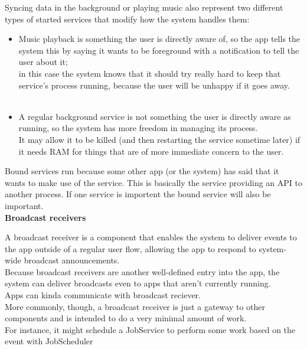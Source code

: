 \newpage

Syncing data in the background or playing music also represent two different types of started services that modify how the system handles them:\\ 
\begin{itemize}
    \item Music playback is something the user is directly aware of, so the app tells the system this by saying it wants to be foreground with a notification to tell the user about it; \\
    in this case the system knows that it should try really hard to keep that service's process running, because the user will be unhappy if it goes away.\\\\
    \item A regular background service is not something the user is directly aware as running, so the system has more freedom in managing its process. \\
    It may allow it to be killed (and then restarting the service sometime later) if it needs RAM for things that are of more immediate concern to the user.\\
\end{itemize}

Bound services run because some other app (or the system) has said that it wants to make use of the service. This is basically the service providing an API to another process. 
If one service is importent the bound service will also be important.\\

\textbf{Broadcast receivers}

A broadcast receiver is a component that enables the system to deliver events to the app outside of a regular user flow, allowing the app to respond to system-wide broadcast announcements. \\
Because broadcast receivers are another well-defined entry into the app, the system can deliver broadcasts even to apps that aren't currently running.\\
Apps can kinda communicate with broadcast reciever.\\
More commonly, though, a broadcast receiver is just a gateway to other components and is intended to do a very minimal amount of work. \\
For instance, it might schedule a JobService to perform some work based on the event with JobScheduler\\

